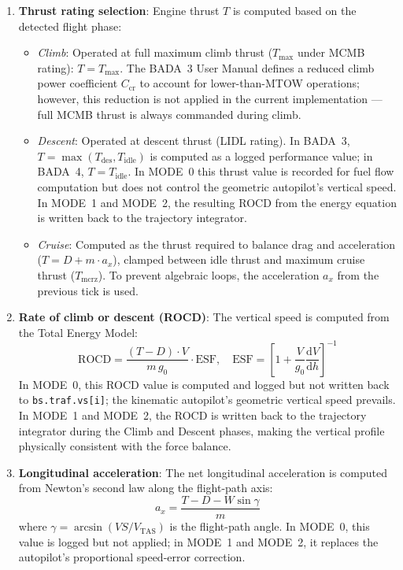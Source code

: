 \begin{enumerate}
    \item \textbf{Thrust rating selection}: Engine thrust $T$ is computed based on the detected flight phase:
    \begin{itemize}
        \item \emph{Climb}: Operated at full maximum climb thrust ($T_{\max}$ under MCMB rating): $T = T_{\max}$. The BADA~3 User Manual defines a reduced climb power coefficient $C_{\text{cr}}$ to account for lower-than-MTOW operations; however, this reduction is not applied in the current implementation — full MCMB thrust is always commanded during climb.
        \item \emph{Descent}: Operated at descent thrust (LIDL rating). In BADA~3, $T = \max(T_{\text{des}}, T_{\text{idle}})$ is computed as a logged performance value; in BADA~4, $T = T_{\text{idle}}$. In MODE~0 this thrust value is recorded for fuel flow computation but does not control the geometric autopilot's vertical speed. In MODE~1 and MODE~2, the resulting ROCD from the energy equation is written back to the trajectory integrator.
        \item \emph{Cruise}: Computed as the thrust required to balance drag and acceleration ($T = D + m \cdot a_x$), clamped between idle thrust and maximum cruise thrust ($T_{\text{mcrz}}$). To prevent algebraic loops, the acceleration $a_x$ from the previous tick is used.
    \end{itemize}
    
    \item \textbf{Rate of climb or descent (ROCD)}: The vertical speed is computed from the Total Energy Model:
    \begin{equation}
        \text{ROCD} = \frac{(T - D) \cdot V}{m \, g_0} \cdot \text{ESF}, \quad
        \text{ESF} = \left[ 1 + \frac{V}{g_0} \frac{\mathrm{d}V}{\mathrm{d}h} \right]^{-1}
        \label{eq:rocd_tem}
    \end{equation}
    In MODE~0, this ROCD value is computed and logged but not written back to \texttt{bs.traf.vs[i]}; the kinematic autopilot's geometric vertical speed prevails. In MODE~1 and MODE~2, the ROCD is written back to the trajectory integrator during the Climb and Descent phases, making the vertical profile physically consistent with the force balance.

    \item \textbf{Longitudinal acceleration}: The net longitudinal acceleration is computed from Newton's second law along the flight-path axis:
    \begin{equation}
        a_x = \frac{T - D - W \sin\gamma}{m}
        \label{eq:ax_force_balance}
    \end{equation}
    where $\gamma = \arcsin(VS / V_{\text{TAS}})$ is the flight-path angle. In MODE~0, this value is logged but not applied; in MODE~1 and MODE~2, it replaces the autopilot's proportional speed-error correction.


\end{enumerate}
